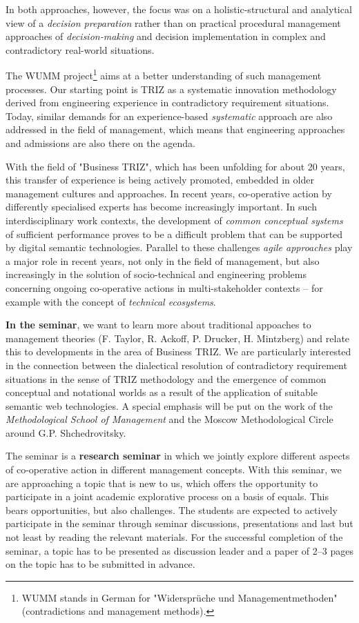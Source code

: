 \documentclass[11pt,a4paper]{article}
\begin{document}
In both approaches, however, the focus was on a holistic-structural and
analytical view of a \emph{decision preparation} rather than on practical
procedural management approaches of \emph{decision-making} and decision
implementation in complex and contradictory real-world situations.

The WUMM project\footnote{WUMM stands in German for "Widersprüche und
  Managementmethoden" (contradictions and management methods).} aims at a
better understanding of such management processes. Our starting point is TRIZ
as a systematic innovation methodology derived from engineering experience in
contradictory requirement situations. Today, similar demands for an
experience-based \emph{systematic} approach are also addressed in the field of
management, which means that engineering approaches and admissions are also
there on the agenda.

With the field of "Business TRIZ", which has been unfolding for about 20
years, this transfer of experience is being actively promoted, embedded in
older management cultures and approaches.  In recent years, co-operative
action by differently specialised experts has become increasingly important.
In such interdisciplinary work contexts, the development of \emph{common
  conceptual systems} of sufficient performance proves to be a difficult
problem that can be supported by digital semantic technologies.  Parallel to
these challenges \emph{agile approaches} play a major role in recent years,
not only in the field of management, but also increasingly in the solution of
socio-technical and engineering problems concerning ongoing co-operative
actions in multi-stakeholder contexts -- for example with the concept of
\emph{technical ecosystems}.

\textbf{In the seminar}, we want to learn more about traditional appoaches to
management theories (F. Taylor, R. Ackoff, P. Drucker, H. Mintzberg) and
relate this to developments in the area of Business TRIZ.  We are particularly
interested in the connection between the dialectical resolution of
contradictory requirement situations in the sense of TRIZ methodology and the
emergence of common conceptual and notational worlds as a result of the
application of suitable semantic web technologies.  A special emphasis will be
put on the work of the \emph{Methodological School of Management} and the
Moscow Methodological Circle around G.P. Shchedrovitsky. 

The seminar is a \textbf{research seminar} in which we jointly explore
different aspects of co-operative action in different management concepts.
With this seminar, we are approaching a topic that is new to us, which offers
the opportunity to participate in a joint academic explorative process on a
basis of equals. This bears opportunities, but also challenges.  The students
are expected to actively participate in the seminar through seminar
discussions, presentations and last but not least by reading the relevant
materials.  For the successful completion of the seminar, a topic has to be
presented as discussion leader and a paper of 2--3 pages on the topic has to
be submitted in advance.
\end{document}
